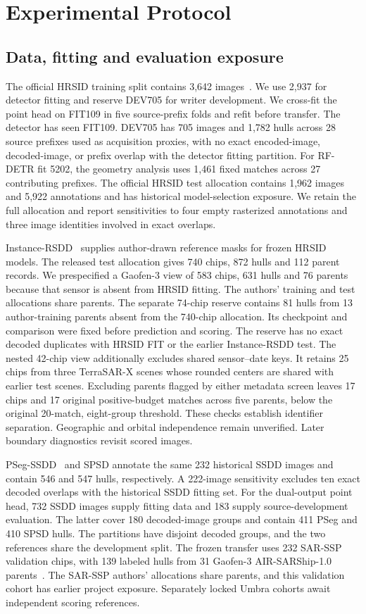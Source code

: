\section{Experimental Protocol}
\label{sec:protocol}

\subsection{Data, fitting and evaluation exposure}
The official HRSID training split contains 3,642 images~\cite{hrsid}. We use 2,937 for detector fitting and reserve DEV705 for writer development. We cross-fit the point head on FIT109 in five source-prefix folds and refit before transfer. The detector has seen FIT109. DEV705 has 705 images and 1,782 hulls across 28 source prefixes used as acquisition proxies, with no exact encoded-image, decoded-image, or prefix overlap with the detector fitting partition. For RF-DETR fit 5202, the geometry analysis uses 1,461 fixed matches across 27 contributing prefixes. The official HRSID test allocation contains 1,962 images and 5,922 annotations and has historical model-selection exposure. We retain the full allocation and report sensitivities to four empty rasterized annotations and three image identities involved in exact overlaps.

Instance-RSDD~\cite{rsdd} supplies author-drawn reference masks for frozen HRSID models. The released test allocation gives 740 chips, 872 hulls and 112 parent records. We prespecified a Gaofen-3 view of 583 chips, 631 hulls and 76 parents because that sensor is absent from HRSID fitting. The authors' training and test allocations share parents. The separate 74-chip reserve contains 81 hulls from 13 author-training parents absent from the 740-chip allocation. Its checkpoint and comparison were fixed before prediction and scoring. The reserve has no exact decoded duplicates with HRSID FIT or the earlier Instance-RSDD test. The nested 42-chip view additionally excludes shared sensor--date keys. It retains 25 chips from three TerraSAR-X scenes whose rounded centers are shared with earlier test scenes. Excluding parents flagged by either metadata screen leaves 17 chips and 17 original positive-budget matches across five parents, below the original 20-match, eight-group threshold. These checks establish identifier separation. Geographic and orbital independence remain unverified. Later boundary diagnostics revisit scored images.

PSeg-SSDD~\cite{ssdd} and SPSD annotate the same 232 historical SSDD images and contain 546 and 547 hulls, respectively. A 222-image sensitivity excludes ten exact decoded overlaps with the historical SSDD fitting set. For the dual-output point head, 732 SSDD images supply fitting data and 183 supply source-development evaluation. The latter cover 180 decoded-image groups and contain 411 PSeg and 410 SPSD hulls. The partitions have disjoint decoded groups, and the two references share the development split. The frozen transfer uses 232 SAR-SSP validation chips, with 139 labeled hulls from 31 Gaofen-3 AIR-SARShip-1.0 parents~\cite{slgsea,airsarship}. The SAR-SSP authors' allocations share parents, and this validation cohort has earlier project exposure. Separately locked Umbra cohorts await independent scoring references.

